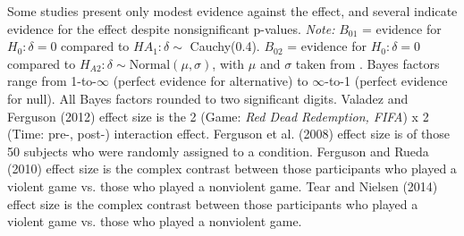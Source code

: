 \documentclass[man]{apa6}
\begin{document}
\begin{table}
\vspace{4mm}
Some studies present only modest evidence against the effect, and several indicate evidence for the effect despite nonsignificant p-values. 
{\em Note:} $B_{01}$ = evidence for $H_0: \delta = 0$ compared to $HA_1: \delta \sim$ Cauchy(0.4). $B_{02}$ = evidence for $H_0: \delta = 0$ compared to $H_{A2}: \delta \sim \mbox{Normal}(\mu, \sigma)$, with $\mu$ and $\sigma$ taken from \citet{Anderson:etal:2010}. Bayes factors range from 1-to-$\infty$ (perfect evidence for alternative) to $\infty$-to-1 (perfect evidence for null). All Bayes factors rounded to two significant digits. Valadez and Ferguson (2012) effect size is the 2 (Game: {\em Red Dead Redemption, FIFA}) x 2 (Time: pre-, post-) interaction effect. Ferguson et al. (2008) effect size is of those 50 subjects who were randomly assigned to a condition. Ferguson and Rueda (2010) effect size is the complex contrast between those participants who played a violent game vs. those who played a nonviolent game. Tear and Nielsen (2014) effect size is the complex contrast between those participants who played a violent game vs. those who played a nonviolent game.
\label{mainStudyResults}
\end{table}
\end{document}
